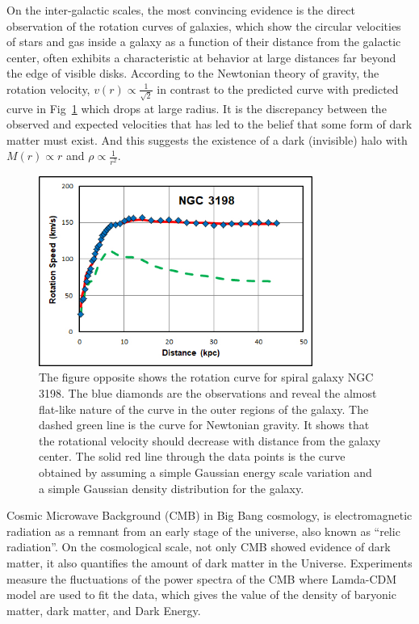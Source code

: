 \par On the inter-galactic scales, the most convincing evidence is the direct observation of the rotation curves of galaxies, which show the circular velocities of stars and gas inside a galaxy as a function of their distance from the galactic center, often exhibits a characteristic at behavior at large distances far beyond the edge of visible disks. According to the Newtonian theory of gravity, the rotation velocity, $v(r) \propto \frac{1}{\sqrt{2}}$ in contrast to the predicted curve with predicted curve in Fig~\ref{fig:rotation} which drops at large radius. It is the discrepancy between the observed and expected velocities that has led to the belief that some form of dark matter must exist. And this suggests the existence of a dark (invisible) halo with $M(r) \propto r$ and $\rho \propto \frac{1}{r^2}$.

\begin{figure}[htbp]
  \begin{center}
    \includegraphics[width=0.8\textwidth]{chapters/c2/figures/ngc3198_sparc.jpg}
  \end{center}
  \caption{The figure opposite shows the rotation curve for spiral galaxy NGC 3198. The blue diamonds are the observations and reveal the almost flat-like nature of the curve in the outer regions of the galaxy. The dashed green line is the curve for Newtonian gravity. It shows that the rotational velocity should decrease with distance from the galaxy center. The solid red line through the data points is the curve obtained by assuming a simple Gaussian energy scale variation and a simple Gaussian density distribution for the galaxy.}
  \label{fig:rotation}
\end{figure}

\par Cosmic Microwave Background (CMB) in Big Bang cosmology, is electromagnetic radiation as a remnant from an early stage of the universe, also known as ``relic radiation''. On the cosmological scale, not only CMB showed evidence of dark matter, it also quantifies the amount of dark matter in the Universe. Experiments measure the fluctuations of the power spectra of the CMB where Lamda-CDM model are used to fit the data, which gives the value of the density of baryonic matter, dark matter, and Dark Energy.

